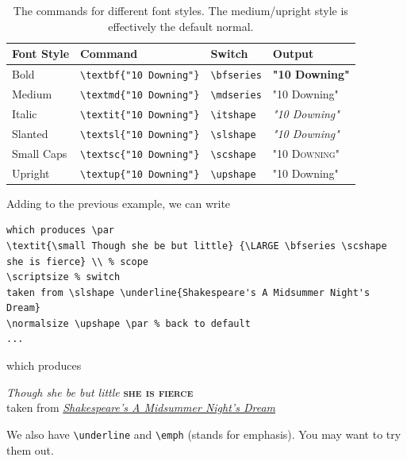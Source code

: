 \begin{table}[ht!]
\begin{tabularx}{\textwidth}{|l|X|l|l|}
\hline
Font Style & Command & Switch & Output \\
\hline
Bold & \texttt{\textbackslash textbf\{"10 Downing"\}}& \texttt{\textbackslash bfseries} & \textbf{"10 Downing"} \\
\hline
Medium & \texttt{\textbackslash textmd\{"10 Downing"\}}& \texttt{\textbackslash mdseries} & \textmd{"10 Downing"} \\
\hline
Italic & \texttt{\textbackslash textit\{"10 Downing"\}}& \texttt{\textbackslash itshape} & \textit{"10 Downing"} \\
\hline
Slanted & \texttt{\textbackslash textsl\{"10 Downing"\}}& \texttt{\textbackslash slshape} & \textsl{"10 Downing"} \\
\hline
Small Caps & \texttt{\textbackslash textsc\{"10 Downing"\}}& \texttt{\textbackslash scshape} & \textsc{"10 Downing"} \\
\hline
Upright & \texttt{\textbackslash textup\{"10 Downing"\}}& \texttt{\textbackslash upshape} & \textup{"10 Downing"} \\
\hline
\end{tabularx}
\caption{The commands for different font styles. The medium/upright style is effectively the default normal.}
\label{tab:fontshape}
\end{table}%
%
Adding to the previous example, we can write
\begin{lstlisting}
which produces \par
\textit{\small Though she be but little} {\LARGE \bfseries \scshape she is fierce} \\ % scope
\scriptsize % switch
taken from \slshape \underline{Shakespeare's A Midsummer Night's Dream}
\normalsize \upshape \par % back to default
...
\end{lstlisting}
which produces \par
\textit{\small Though she be but little} {\LARGE \bfseries \scshape she is fierce} \\
\scriptsize
taken from \slshape \underline{Shakespeare's A Midsummer Night's Dream}
\normalsize \upshape \par
We also have \texttt{\textbackslash underline} and \texttt{\textbackslash emph} (stands for emphasis). You may want to try them out.

